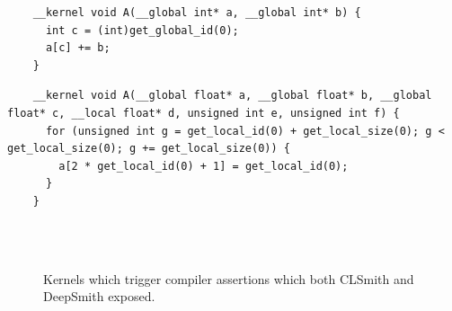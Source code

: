 
\newsavebox{\IntelPtrAssertion}
\begin{lrbox}{\IntelPtrAssertion}
  \hspace{1.5em}
  \begin{lstlisting}
    __kernel void A(__global int* a, __global int* b) {
      int c = (int)get_global_id(0);
      a[c] += b;
    }
  \end{lstlisting}
\end{lrbox}

\newsavebox{\IntelScalarAssertion}
\begin{lrbox}{\IntelScalarAssertion}
  \hspace{1.5em}
  \begin{lstlisting}
    __kernel void A(__global float* a, __global float* b, __global float* c, __local float* d, unsigned int e, unsigned int f) {
      for (unsigned int g = get_local_id(0) + get_local_size(0); g < get_local_size(0); g += get_local_size(0)) {
        a[2 * get_local_id(0) + 1] = get_local_id(0);
      }
    }
  \end{lstlisting}
\end{lrbox}

\begin{figure}
  \centering %
  \\%
  \\%
  \caption{Kernels which trigger compiler assertions which both CLSmith and DeepSmith exposed.}%
  \label{lst:clsmith-compiler-assertions}%
\end{figure}

